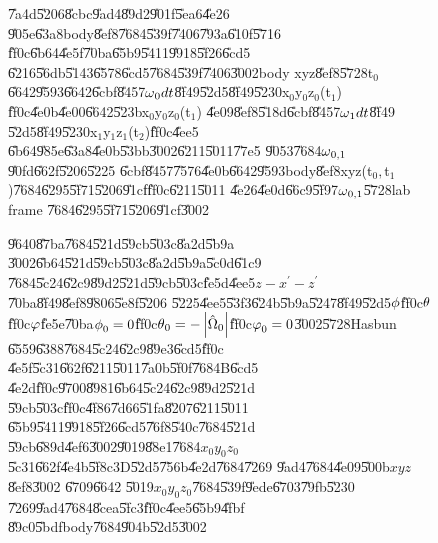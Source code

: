 \documentclass[12pt,a4paper]{article}
\begin{document}
\begin{figure}[th]
\caption{\U{7a4d}\U{5206}\U{8cbc}\U{9ad4}\U{89d2}\U{901f}\U{5ea6}\U{4e26}%
\U{905e}\U{63a8}body\U{8ef8}\U{7684}\U{539f}\U{7406}\U{793a}\U{610f}\U{5716}%
\U{ff0c}\U{6b64}\U{4e5f}\U{70ba}\U{65b9}\U{5411}\U{9918}\U{5f26}\U{6cd5}%
\U{6216}\U{56db}\U{5143}\U{6578}\U{6cd5}\U{7684}\U{539f}\U{7406}\U{3002}body
xyz\U{8ef8}\U{5728}t$_{0}$\U{6642}\U{9593}\U{6642}\U{6cbf}\U{8457}$\protect%
\omega _{0}dt$\U{8f49}\U{52d5}\U{8f49}\U{5230}x$_{0}$y$_{0}$z$_{0}$(t$_{1}$)%
\U{ff0c}\U{4e0b}\U{4e00}\U{6642}\U{523b}x$_{0}$y$_{0}$z$_{0}$(t$_{1}$)%
\U{4e09}\U{8ef8}\U{518d}\U{6cbf}\U{8457}$\protect\omega _{1}dt$\U{8f49}%
\U{52d5}\U{8f49}\U{5230}x$_{1}$y$_{1}$z$_{1}$(t$_{2}$)\U{ff0c}\U{4ee5}%
\U{6b64}\U{985e}\U{63a8}\U{4e0b}\U{53bb}\U{3002}\U{6211}\U{5011}\U{77e5}%
\U{9053}\U{7684}$\protect\omega _{0,1}$\U{90fd}\U{662f}\U{5206}\U{5225}%
\U{6cbf}\U{8457}\U{7576}\U{4e0b}\U{6642}\U{9593}body\U{8ef8}xyz(t$_{0},$t$%
_{1}$)\U{7684}\U{6295}\U{5f71}\U{5206}\U{91cf}\U{ff0c}\U{6211}\U{5011}%
\U{4e26}\U{4e0d}\U{66c9}\U{5f97}$\protect\omega _{0,1}$\U{5728}lab frame%
\U{7684}\U{6295}\U{5f71}\U{5206}\U{91cf}\U{3002}}
\begin{center}
\fbox{ }
\end{center}
\end{figure}

\begin{figure}[th]
\caption{\U{9640}\U{87ba}\U{7684}\U{521d}\U{59cb}\U{503c}\U{8a2d}\U{5b9a}%
\U{3002}\U{6b64}\U{521d}\U{59cb}\U{503c}\U{8a2d}\U{5b9a}\U{5c0d}\U{61c9}%
\U{7684}\U{5c24}\U{62c9}\U{89d2}\U{521d}\U{59cb}\U{503c}\U{fe5d}\U{4ee5}$%
z-x^{\prime }-z^{\prime }$\U{70ba}\U{8f49}\U{8ef8}\U{9806}\U{5e8f}\U{5206}%
\U{5225}\U{4ee5}\U{53f3}\U{624b}\U{5b9a}\U{5247}\U{8f49}\U{52d5}$\protect%
\phi $\U{ff0c}$\protect\theta $\U{ff0c}$\protect\varphi $\U{fe5e}\U{70ba}$%
\protect\phi _{0}=0$\U{ff0c}$\protect\theta _{0}=-\left\vert \hat{\Omega}%
_{0}\right\vert $\U{ff0c}$\protect\varphi _{0}=0$\U{3002}\U{5728}Hasbun%
\U{6559}\U{6388}\U{7684}\U{5c24}\U{62c9}\U{89e3}\U{6cd5}\thinspace \U{ff0c}%
\U{4e5f}\U{5c31}\U{662f}\U{6211}\U{5011}\U{7a0b}\U{5f0f}\U{7684}B\U{6cd5}%
\U{4e2d}\U{ff0c}\U{9700}\U{8981}\U{6b64}\U{5c24}\U{62c9}\U{89d2}\U{521d}%
\U{59cb}\U{503c}\U{ff0c}\U{4f86}\U{7d66}\U{51fa}\U{8207}\U{6211}\U{5011}%
\U{65b9}\U{5411}\U{9918}\U{5f26}\U{6cd5}\U{76f8}\U{540c}\U{7684}\U{521d}%
\U{59cb}\U{689d}\U{4ef6}\U{3002}\U{9019}\U{88e1}\U{7684}$x_{0}y_{0}z_{0}$%
\U{5c31}\U{662f}\U{4e4b}\U{5f8c}3D\U{52d5}\U{756b}\U{4e2d}\U{7684}\U{7269}%
\U{9ad4}\U{7684}\U{4e09}\U{500b}$xyz$\U{8ef8}\U{3002} \U{6709}\U{6642}%
\U{5019}$x_{0}y_{0}z_{0}$\U{7684}\U{539f}\U{9ede}\U{6703}\U{79fb}\U{5230}%
\U{7269}\U{9ad4}\U{7684}\U{8cea}\U{5fc3}\U{ff0c}\U{4ee5}\U{65b9}\U{4fbf}%
\U{89c0}\U{5bdf}body\U{7684}\U{904b}\U{52d5}\U{3002}}
\begin{center}
\fbox{}
\end{center}
\end{figure}
\end{document}
